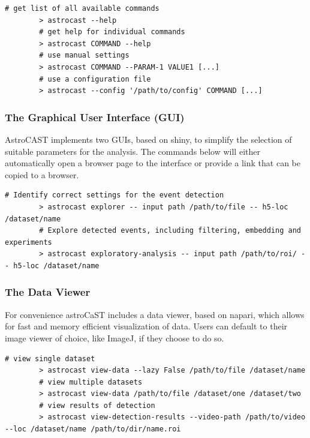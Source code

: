 \documentclass[utf8]{FrontiersinHarvard}
\begin{document}
    \begin{lstlisting}[style=bashStyle]
        # get list of all available commands
        > astrocast --help
        # get help for individual commands
        > astrocast COMMAND --help
        # use manual settings
        > astrocast COMMAND --PARAM-1 VALUE1 [...]
        # use a configuration file
        > astrocast --config '/path/to/config' COMMAND [...]
    \end{lstlisting}

    \subsubsection{The Graphical User Interface (GUI)}

    AstroCAST implements two \ac{GUI}s, based on shiny\citep{chang_shiny_2024}, to simplify the selection of suitable parameters for the analysis. The commands below will either automatically open a browser page to the interface or provide a link that can be copied to a browser.

    \begin{lstlisting}[style=bashStyle]
        # Identify correct settings for the event detection
        > astrocast explorer -- input path /path/to/file -- h5-loc /dataset/name
        # Explore detected events, including filtering, embedding and experiments
        > astrocast exploratory-analysis -- input path /path/to/roi/ -- h5-loc /dataset/name
    \end{lstlisting}

    \subsubsection{The Data Viewer}

    For convenience astroCaST includes a data viewer, based on napari\citep{sofroniew_nicholas_napari_2022}, which allows for fast and memory efficient visualization of data. Users can default to their image viewer of choice, like ImageJ, if they choose to do so.

    \begin{lstlisting}[style=bashStyle]
        # view single dataset
        > astrocast view-data --lazy False /path/to/file /dataset/name
        # view multiple datasets
        > astrocast view-data /path/to/file /dataset/one /dataset/two
        # view results of detection
        > astrocast view-detection-results --video-path /path/to/video --loc /dataset/name /path/to/dir/name.roi
    \end{lstlisting}
\end{document}
